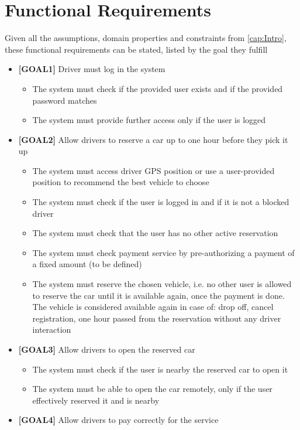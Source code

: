 \section{Functional Requirements}

Given all the assumptions, domain properties and constraints from \underline{\autoref{cap:Intro}}, these functional requirements can be stated, listed by the goal they fulfill

\begin{itemize}
\item \textbf{[GOAL1]} Driver must log in the system 
	\begin{itemize}
	\item The system must check if the provided user exists and if the provided password matches
	\item The system must provide further access only if the user is logged
	\end{itemize}
\item \textbf{[GOAL2]} Allow drivers to reserve a car up to one hour before they pick it up
	\begin{itemize}
	\item The system must access driver GPS position or use a user-provided position to recommend the best vehicle to choose
	\item The system must check if the user is logged in and if it is not a blocked driver
	\item The system must check that the user has no other active reservation 
	\item The system must check payment service by pre-authorizing a payment of a fixed amount (to be defined)
	\item The system must reserve the chosen vehicle, i.e. no other user is allowed to reserve the car until it is available again, once the payment is done. The vehicle is considered available again in case of: drop off, cancel registration, one hour passed from the reservation without any driver interaction
	\end{itemize}
\item \textbf{[GOAL3]} Allow drivers to open the reserved car
	\begin{itemize}
	\item The system must check if the user is nearby the reserved car to open it
	\item The system must be able to open the car remotely, only if the user effectively reserved it and is nearby
	\end{itemize}
\item \textbf{[GOAL4]} Allow drivers to pay correctly for the service

\end{itemize}
